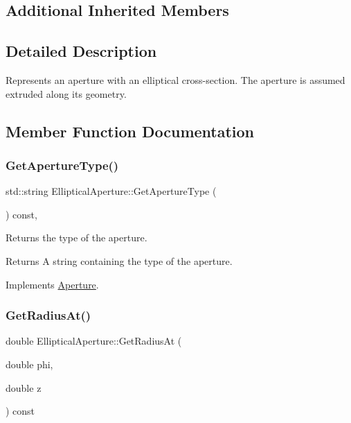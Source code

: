 \subsection*{Additional Inherited Members}


\subsection{Detailed Description}
Represents an aperture with an elliptical cross-\/section. The aperture is assumed extruded along its geometry. 

\subsection{Member Function Documentation}
\mbox{\label{classEllipticalAperture_a8c56e3ab5e8483dd42ed6e35855409df}} 
\subsubsection{\texorpdfstring{Get\+Aperture\+Type()}{GetApertureType()}}
{\footnotesize\ttfamily std\+::string Elliptical\+Aperture\+::\+Get\+Aperture\+Type (\begin{DoxyParamCaption}{ }\end{DoxyParamCaption}) const\hspace{0.3cm}{\ttfamily [inline]}, {\ttfamily [virtual]}}

Returns the type of the aperture. \begin{DoxyReturn}{Returns}
A string containing the type of the aperture. 
\end{DoxyReturn}


Implements \hyperlink{classAperture_ad7af612271a0586feea83c38549dfb75}{Aperture}.

\mbox{\label{classEllipticalAperture_aec41ce72d82e004b8de123e37d3b11e9}} 
\subsubsection{\texorpdfstring{Get\+Radius\+At()}{GetRadiusAt()}}
{\footnotesize\ttfamily double Elliptical\+Aperture\+::\+Get\+Radius\+At (\begin{DoxyParamCaption}\item[{double}]{phi,  }\item[{double}]{z }\end{DoxyParamCaption}) const\hspace{0.3cm}{\ttfamily [virtual]}}

